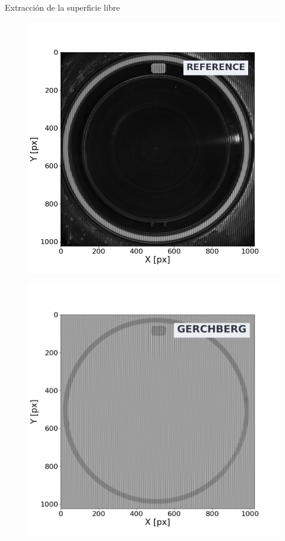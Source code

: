 \documentclass[aspectratio=169]{beamer}
\begin{document}
\begin{frame}{Extracción de la superficie libre} %
	\begin{minipage}{0.49\textwidth}
	  \begin{figure}
	    \includegraphics[width=\linewidth]{figs/ftp_reference.png}
	  \end{figure}
	\end{minipage} \hfill
	\begin{minipage}{0.49\textwidth}
	  \begin{figure}
	    \includegraphics[width=\linewidth]{figs/ftp_gerchberg.png}
	  \end{figure}
	\end{minipage}
\end{frame}
\end{document}
